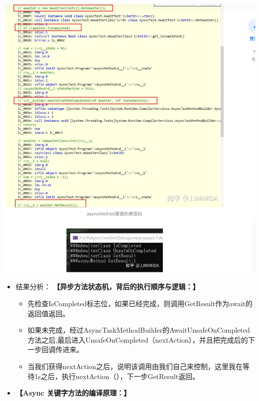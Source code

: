 \documentclass[9pt, b5paper]{article}
\begin{document}
\includegraphics[width=.9\linewidth]{./pic/et3_20230609_112727.png}
\begin{itemize}
\item 结果分析： \textbf{【异步方法状态机，背后的执行顺序与逻辑：】}
\begin{itemize}
\item 先检查IsCompleted标志位，如果已经完成，则调用GetResult作为await的返回值返回。
\item 如果未完成，经过AsyncTaskMethodBuilder的AwaitUnsafeOnCompleted方法之后,最后进入UnsafeOnCompleted（nextAction），并且把完成后的下一步回调传进来。
\item 当我们获得nextAction之后，说明该调用由我们自己来控制，这里我在等待1s之后，执行nextAction（），下一步GetResult返回。
\end{itemize}
\item \textbf{【Async 关键字方法的编译原理：】}
\end{itemize}
\end{document}
